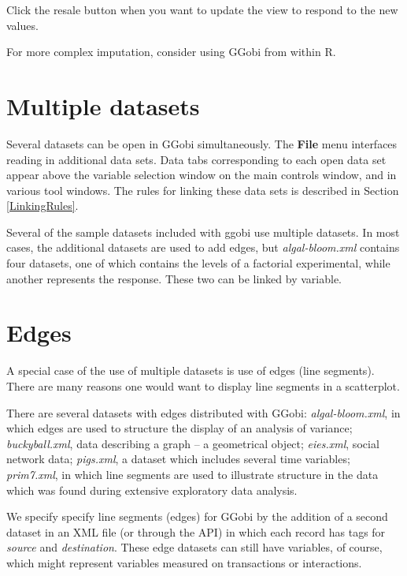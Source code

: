 \documentclass[11pt]{article}
\begin{document}
Click the resale button when you want to update the view to
respond to the new values.

For more complex imputation, consider using GGobi from within R.

%
%

\section{Multiple datasets}

Several datasets can be open in GGobi simultaneously. The {\bf File}
menu interfaces reading in additional data sets. Data tabs corresponding
to each open data set appear above the variable selection window on
the main controls window, and in various tool windows. The rules for
linking these data sets is described in Section \ref{LinkingRules}.

Several of the sample datasets included with ggobi use multiple datasets.
In most cases, the additional datasets are used to add edges, but {\em
algal-bloom.xml} contains four datasets, one of which contains the levels
of a factorial experimental, while another represents the response.
These two can be linked by variable.

\section{Edges}

A special case of the use of multiple datasets is use of edges (line
segments).  There are many reasons one would want to display line segments
in a scatterplot. 

There are several datasets with edges distributed with GGobi: {\em
algal-bloom.xml}, in which edges are used to structure the display of an
analysis of variance; {\em buckyball.xml}, data describing a graph -- a
geometrical object; {\em eies.xml}, social network data; {\em pigs.xml},
a dataset which includes several time variables; {\em prim7.xml},
in which line segments are used to illustrate structure in the
data which was found during extensive exploratory data analysis.

We specify specify line segments (edges) for GGobi by the addition of a
second dataset in an XML file (or through the API) in which each record
has tags for {\it source} and {\it destination}.  These edge datasets
can still have variables, of course, which might represent variables
measured on transactions or interactions.
\end{document}

